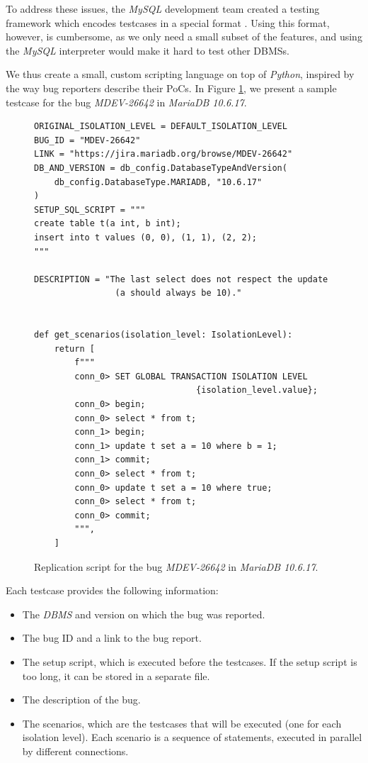 To address these issues, the \textit{MySQL} development team created a testing framework which encodes testcases in a special format \cite{mysqltestrun}. Using this format, however, is cumbersome, as we only need a small subset of the features, and using the \textit{MySQL} interpreter would make it hard to test other DBMSs. 

We thus create a small, custom scripting language on top of \textit{Python}, inspired by the way bug reporters describe their PoCs. In Figure \ref{fig:bug_metalanguage_sample}, we present a sample testcase for the bug \textit{MDEV-26642} in \textit{MariaDB 10.6.17}.

\begin{figure}
\begin{verbatim}
ORIGINAL_ISOLATION_LEVEL = DEFAULT_ISOLATION_LEVEL
BUG_ID = "MDEV-26642"
LINK = "https://jira.mariadb.org/browse/MDEV-26642"
DB_AND_VERSION = db_config.DatabaseTypeAndVersion(
    db_config.DatabaseType.MARIADB, "10.6.17"
)
SETUP_SQL_SCRIPT = """
create table t(a int, b int);
insert into t values (0, 0), (1, 1), (2, 2);
"""

DESCRIPTION = "The last select does not respect the update
                (a should always be 10)."


def get_scenarios(isolation_level: IsolationLevel):
    return [
        f"""
        conn_0> SET GLOBAL TRANSACTION ISOLATION LEVEL
                                {isolation_level.value};
        conn_0> begin;
        conn_0> select * from t;
        conn_1> begin;
        conn_1> update t set a = 10 where b = 1;
        conn_1> commit;
        conn_0> select * from t;
        conn_0> update t set a = 10 where true;
        conn_0> select * from t;
        conn_0> commit;
        """,
    ]
\end{verbatim}
\caption{Replication script for the bug \textit{MDEV-26642} in \textit{MariaDB 10.6.17}.} \label{fig:bug_metalanguage_sample}
\end{figure}

Each testcase provides the following information:
\begin{itemize}
    \item The \textit{DBMS} and version on which the bug was reported.
    \item The bug ID and a link to the bug report.
    \item The setup script, which is executed before the testcases. If the setup script is too long, it can be stored in a separate file.
    \item The description of the bug.
    \item The scenarios, which are the testcases that will be executed (one for each isolation level). Each scenario is a sequence of statements, executed in parallel by different connections.
\end{itemize}

